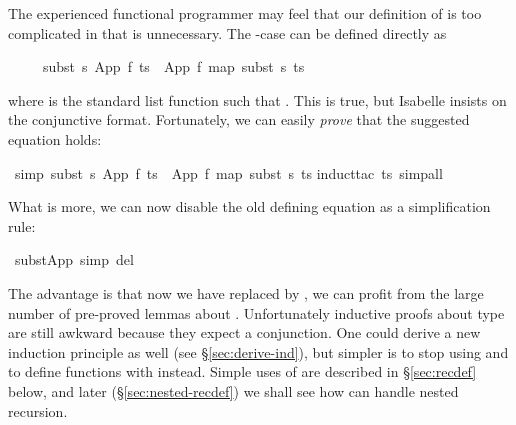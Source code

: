 \begin{isabellebody}
\begin{isamarkuptext}
The experienced functional programmer may feel that our definition of
 is too complicated in that  is
unnecessary. The -case can be defined directly as
\begin{isabelle}%
\ \ \ \ \ subst\ s\ {\isacharparenleft}App\ f\ ts{\isacharparenright}\ {\isacharequal}\ App\ f\ {\isacharparenleft}map\ {\isacharparenleft}subst\ s{\isacharparenright}\ ts{\isacharparenright}%
\end{isabelle}
where  is the standard list function such that
. This is true, but Isabelle
insists on the conjunctive format. Fortunately, we can easily \emph{prove}
that the suggested equation holds:%
\end{isamarkuptext}%
\isamarkuptrue%
%
\isadelimproof
%
\endisadelimproof
%
\isatagproof
%
\endisatagproof
{\isafoldproof}%
%
\isadelimproof
%
\endisadelimproof
%
\isadelimproof
%
\endisadelimproof
%
\isatagproof
%
\endisatagproof
{\isafoldproof}%
%
\isadelimproof
%
\endisadelimproof
%
\isadelimproof
%
\endisadelimproof
%
\isatagproof
%
\endisatagproof
{\isafoldproof}%
%
\isadelimproof
\isanewline
%
\endisadelimproof
{}\isamarkupfalse%
\ {\isacharbrackleft}simp{\isacharbrackright}{\isacharcolon}\ {\isachardoublequoteopen}subst\ s\ {\isacharparenleft}App\ f\ ts{\isacharparenright}\ {\isacharequal}\ App\ f\ {\isacharparenleft}map\ {\isacharparenleft}subst\ s{\isacharparenright}\ ts{\isacharparenright}{\isachardoublequoteclose}\isanewline
%
\isadelimproof
%
\endisadelimproof
%
\isatagproof
{}\isamarkupfalse%
{\isacharparenleft}induct{\isacharunderscore}tac\ ts{\isacharcomma}\ simp{\isacharunderscore}all{\isacharparenright}\isanewline
{}\isamarkupfalse%
%
\endisatagproof
{\isafoldproof}%
%
\isadelimproof
%
\endisadelimproof
%
\begin{isamarkuptext}%
\noindent
What is more, we can now disable the old defining equation as a
simplification rule:%
\end{isamarkuptext}%
\isamarkuptrue%
\isamarkupfalse%
\ subst{\isacharunderscore}App\ {\isacharbrackleft}simp\ del{\isacharbrackright}%
\begin{isamarkuptext}%
\noindent
The advantage is that now we have replaced  by
, we can profit from the large number of pre-proved lemmas
about .  Unfortunately inductive proofs about type
 are still awkward because they expect a conjunction. One
could derive a new induction principle as well (see
\S\ref{sec:derive-ind}), but simpler is to stop using 
and to define functions with  instead.
Simple uses of  are described in \S\ref{sec:recdef} below,
and later (\S\ref{sec:nested-recdef}) we shall see how  can 
handle nested recursion.


\end{isamarkuptext}
\end{isabellebody}
